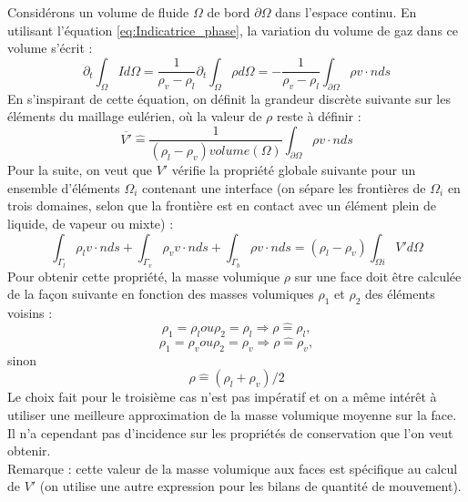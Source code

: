 Consid\'erons un volume de fluide $\Omega$ de bord $\partial\Omega$ dans l’espace continu. En utilisant l’\'equation \ref{eq:Indicatrice_phase}, la variation du volume de gaz dans ce volume s’\'ecrit :
\begin{equation}
\partial_{t} \int_{\Omega} I d\Omega = \dfrac{1}{\rho_{v}-\rho_{l}} \partial_{t} \int_{\Omega} \rho d\Omega = - \dfrac{1}{\rho_{v}-\rho_{l}} \int_{\partial\Omega} \rho v \cdot n ds \label{eq:FTIJK_varVolumeGaz}
\end{equation}
En s’inspirant de cette \'equation, on d\'efinit la grandeur discr\`ete suivante sur les \'el\'ements du maillage eul\'erien, o\`u la valeur de $\rho$ reste à d\'efinir :
\begin{equation}
\overline{V'} \hat{=} \dfrac{1}{(\rho_{l} - \rho_{v}) volume(\Omega)} \int_{\partial\Omega} \rho v \cdot n ds
\end{equation}
Pour la suite, on veut que $V'$ v\'erifie la propri\'et\'e globale suivante pour un ensemble d’\'el\'ements $\Omega_{i}$ contenant une interface (on s\'epare les frontières de $\Omega_{i}$ en trois domaines, selon que la fronti\`ere est en contact avec un \'el\'ement plein de liquide, de vapeur ou mixte) :
\begin{equation}
\int_{\Gamma_{l}} \rho_{l} v \cdot n ds + \int_{\Gamma_{v}} \rho_{v} v \cdot n ds + \int_{\Gamma_{b}} \rho v \cdot n ds = (\rho_{l} - \rho_{v}) \int_{\Omega i} V' d\Omega \label{eq:FTIJK_Vprime}
\end{equation}
Pour obtenir cette propri\'et\'e, la masse volumique $\rho$ sur une face doit \^etre calcul\'ee de la façon suivante en fonction des masses volumiques $\rho_{1}$ et $\rho_{2}$ des \'el\'ements voisins :
\begin{equation}
\rho_{1} = \rho_{l} ou \rho_{2} = \rho_{l} \Rightarrow \rho \hat{=} \rho_{l},
\end{equation}
\begin{equation}
\rho_{1} = \rho_{v} ou \rho_{2} = \rho_{v} \Rightarrow \rho \hat{=} \rho_{v},
\end{equation}
sinon
\begin{equation}
\rho \hat{=} (\rho_{l} + \rho_{v}) /2 \label{eq:FTIJK_approxMasseVolumique}
\end{equation}
Le choix fait pour le troisi\`eme cas n’est pas imp\'eratif et on a m\^eme int\'er\^et \`a utiliser une meilleure approximation de la masse volumique moyenne sur la face. Il n’a cependant pas d’incidence sur les propri\'et\'es de conservation que l’on veut obtenir.\\
Remarque : cette valeur de la masse volumique aux faces est sp\'ecifique au calcul de $V'$ (on utilise une autre expression pour les bilans de quantit\'e de mouvement).

